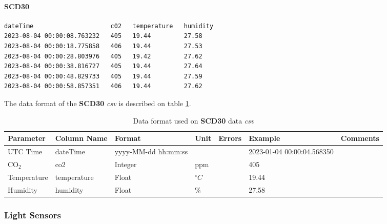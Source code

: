 \documentclass[12pt]{article}
\begin{document}
\paragraph{SCD30}
\label{sec:scd30DataFormat}
{\begin{verbatim}
dateTime                     c02   temperature   humidity
2023-08-04 00:00:08.763232   405   19.44         27.58
2023-08-04 00:00:18.775858   406   19.44         27.53
2023-08-04 00:00:28.803976   405   19.42         27.62
2023-08-04 00:00:38.816727   405   19.44         27.64
2023-08-04 00:00:48.829733   405   19.44         27.59
2023-08-04 00:00:58.857351   406   19.44         27.62

\end{verbatim} }
The data format of the \textbf{SCD30} \emph{csv} is described on table \ref{t:dataFormatscd30}.
    
        
        \begin{table}[H]
    	\caption{Data format used on \textbf{SCD30} data \emph{csv}}
    	 \label{t:dataFormatscd30}
    	\small
    	\begin{tabular}{||p{2cm}| p{2cm}|p{2cm}|p{1.5cm}|p{1.5cm}|p{2cm}|p{2cm}||}
    		\hline
    		\hline
    		Parameter & Column Name & Format & Unit & Errors & Example & Comments \\ 
            \hline
            \hline
    	    UTC Time & dateTime & yyyy-MM-dd hh:mm:ss & & & \tiny 2023-01-04 00:00:04.568350 &  \\
            \hline
    		CO$_{2}$ & co2  & Integer & 
               ppm  & & 405 &   \\
    	    \hline
    		Temperature & temperature  & Float & 
               $ ^{\circ} C$  & & 19.44 &  \\
               	\hline
    		Humidity & humidity  & Float & 
               $ \% $  & & 27.58 &   \\

               	\hline
    		\hline
    	\end{tabular}
    \end{table}


\subsubsection{Light Sensors}
\end{document}
